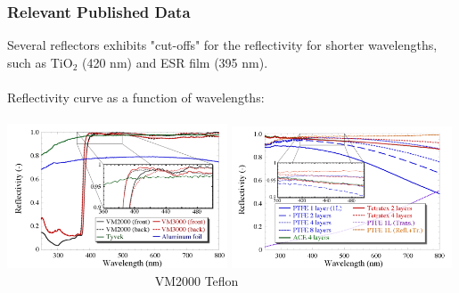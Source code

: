 \documentclass[xcolor=x11names, compress, handout]{beamer}
\renewcommand{\(}{\begin{columns}}
\renewcommand{\)}{\end{columns}}
\newcommand{\<}[1]{\begin{column}{#1}}
\renewcommand{\>}{\end{column}}
\begin{document}
\begin{frame}
\frametitle{Relevant Published Data}
Several reflectors exhibits "cut-offs" for the reflectivity for shorter wavelengths, such as TiO$_2$ (420 nm) and ESR film (395 nm). \cite{janecek_2012} \\
\ \\
Reflectivity curve as a function of wavelengths: \\
\ \\
\includegraphics[width=0.49\textwidth, height=0.45\textheight]{images/vm2000_reflectivity_curve1}
\includegraphics[width=0.49\textwidth, height=0.45\textheight]{images/teflon_reflectivity_curve1}
\scriptsize \flushleft~~~~~~~~~~~~~~~~~~~~~~~ VM2000 \cite{janecek_2012}  \hspace{5cm} Teflon \cite{janecek_2012} \hspace{3cm}
\end{frame}
\end{document}
